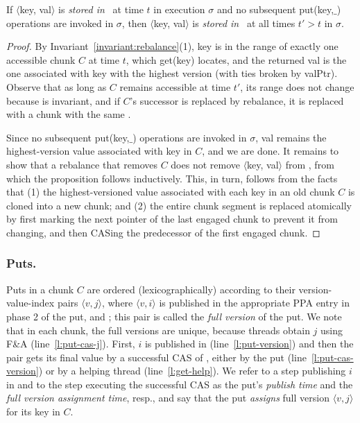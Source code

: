 \begin{proposition}
If $\langle$key, val$ \rangle$ is \emph{stored in} \kiwi\ at time $t$ in execution $\sigma$ and no subsequent put(key,$\_$)  operations are invoked in $\sigma$, 
then $\langle$key, val$ \rangle$ is \emph{stored in} \kiwi\ at all times $t' > t$ in  $\sigma$.
\label{proposition:no-loss}
\end{proposition}
\begin{proof}
By Invariant~\ref{invariant:rebalance}(1), key is in the range of exactly one accessible chunk $C$ at time $t$,  which  get(key) locates, 
and the returned val is the one associated with key with the highest version (with ties broken by valPtr). 
Observe that as long as $C$ remains accessible at time $t'$, its range does not change because  is invariant, and if $C$'s successor is 
replaced by rebalance, it is replaced with a chunk with the same . 

Since no   subsequent put(key,$\_$)  operations are invoked in $\sigma$, val remains the highest-version value associated with key in $C$, and we are done.
It remains to show that a rebalance that removes $C$ does not remove $\langle$key, val$ \rangle$ from \kiwi, from which the proposition follows   inductively.
This, in turn, follows from the facts that (1) the highest-versioned value associated with each key in an old chunk $C$ is cloned into a new chunk; and 
(2) the entire chunk segment is replaced atomically by first marking the next pointer of the last engaged chunk to prevent it from changing, and then 
CASing the predecessor of the first engaged chunk.
 \end{proof}

\subsubsection{Puts.} 
\label{ssec:put-proof}

Puts in a chunk $C$
are ordered (lexicographically) according to their version-value-index   pairs $\langle v, j \rangle$, where
$\langle v, i \rangle$ is published in the appropriate  PPA entry in phase 2 of the put, and ; this pair is called the \emph{full version} of the put.
We note that in each chunk, the full versions are unique, because threads obtain $j$ using F\&A (line~\ref{l:put-cas-j}).
First,  $i$ is published in  (line~\ref{l:put-version}) and then
the  pair gets its final value by a successful CAS of , either by the put (line~\ref{l:put-cas-version}) or by a helping thread (line~\ref {l:get-help}). 
We refer to 
a step publishing $i$ in  and to
the step executing the successful CAS  as the put's \emph{publish time} and the \emph{full version assignment time}, resp., 
and say that the put \emph{assigns} full version $\langle v, j \rangle$ for its key in $C$.

